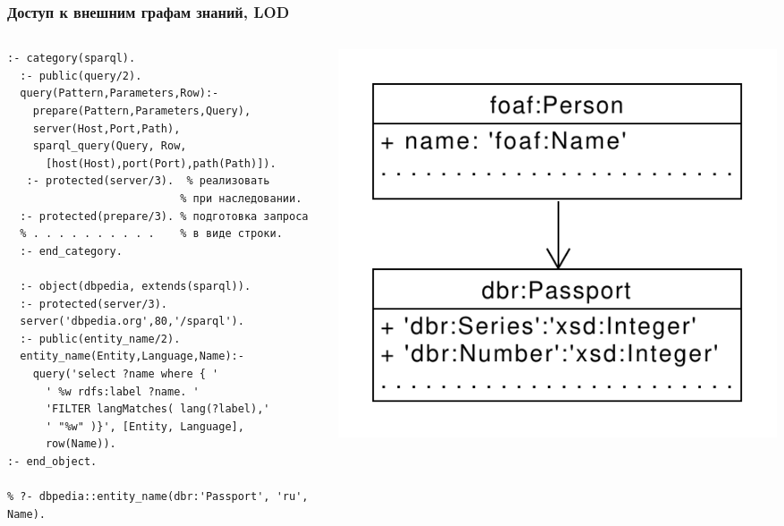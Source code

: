 \documentclass[10pt]{beamer}
\begin{document}
\begin{frame}[fragile]
  \frametitle{Доступ к внешним графам знаний, LOD}

  \begin{columns}
\begin{column}{0.5\textwidth}
\begin{verbatim}
:- category(sparql).
  :- public(query/2).
  query(Pattern,Parameters,Row):-
    prepare(Pattern,Parameters,Query),
    server(Host,Port,Path),
    sparql_query(Query, Row,
      [host(Host),port(Port),path(Path)]).
   :- protected(server/3).  % реализовать
                           % при наследовании.
  :- protected(prepare/3). % подготовка запроса
  % . . . . . . . . . .    % в виде строки.
  :- end_category.

  :- object(dbpedia, extends(sparql)).
  :- protected(server/3).
  server('dbpedia.org',80,'/sparql').
  :- public(entity_name/2).
  entity_name(Entity,Language,Name):-
    query('select ?name where { '
      ' %w rdfs:label ?name. '
      'FILTER langMatches( lang(?label),'
      ' "%w" )}', [Entity, Language],
      row(Name)).
:- end_object.

% ?- dbpedia::entity_name(dbr:'Passport', 'ru', Name).
\end{verbatim}
\end{column}
\begin{column}{0.5\textwidth}
  \flushright
\includegraphics[width=0.8\linewidth]{simple-diag.pdf}
\end{column}
\end{columns}
\end{frame}
\end{document}
